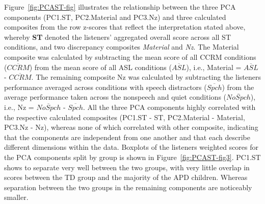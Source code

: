 \documentclass[a4paper, twoside]{templates/ociamthesis}
\begin{document}
Figure~\ref{fig:PCAST-fig} illustrates the relationship between the three PCA components (PC1.ST, PC2.Material and PC3.Nz) and three calculated composites from the row z-scores that reflect the interpretation stated above, whereby \textbf{ST} denoted the listeners' aggregated overall score across all ST conditions, and two discrepancy composites \emph{Material} and \emph{Nz}. The Material composite was calculated by subtracting the mean score of all CCRM conditions (\(\overline{CCRM}\)) from the mean score of all ASL conditions (\(\overline{ASL}\)), i.e., Material = \(\overline{ASL}\) - \(\overline{CCRM}\). The remaining composite Nz was calculated by subtracting the listeners performance averaged across conditions with speech distractors (\(\overline{Spch}\)) from the average performance taken across the nonspeech and quiet conditions (\(\overline{NoSpch}\)), i.e., Nz = \(\overline{NoSpch}\) - \(\overline{Spch}\). All the three PCA components highly correlated with the respective calculated composites (PC1.ST - ST, PC2.Material - Material, PC3.Nz - Nz), whereas none of which correlated with other composite, indicating that the components are independent from one another and that each describe different dimensions within the data. Boxplots of the listeners weighted scores for the PCA components split by group is shown in Figure~\ref{fig:PCAST-fig3}. PC1.ST shows to separate very well between the two groups, with very little overlap in scores between the TD group and the majority of the APD children. Whereas separation between the two groups in the remaining components are noticeably smaller.
\end{document}
